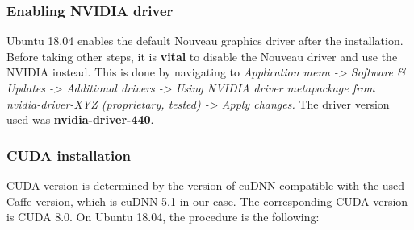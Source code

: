 \subsubsection{Enabling NVIDIA driver}

Ubuntu 18.04 enables the default Nouveau graphics driver after the installation. Before taking other steps, it is \textbf{vital} to disable the Nouveau driver and use the NVIDIA instead. This is done by navigating to \textit{Application menu -> Software \& Updates -> Additional drivers
	-> Using NVIDIA driver metapackage from nvidia-driver-XYZ (proprietary, tested) -> Apply changes.} The driver version used was \textbf{nvidia-driver-440}.


\subsubsection{CUDA installation}

CUDA version is determined by the version of cuDNN compatible with the used Caffe version, which is cuDNN 5.1 in our case. The corresponding CUDA version is CUDA 8.0. On Ubuntu 18.04, the procedure is the following:

